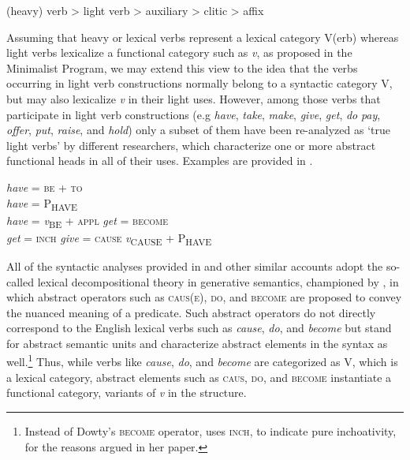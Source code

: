 \begin{exe}
\ex \label{ex:25} 	(heavy) verb > light verb > auxiliary > clitic > affix
\end{exe}

Assuming that heavy or lexical verbs represent a lexical category V(erb) where\-as light verbs lexicalize a functional category such as \textit{v}, as proposed in the Minimalist Program, we may extend this view to the idea that the verbs occurring in light verb constructions normally belong to a syntactic category V, but may also lexicalize \textit{v} in their light uses. However, among those verbs that participate in light verb constructions (e.g \textit{have}, \textit{take}, \textit{make}, \textit{give}, \textit{get}, \textit{do} \textit{pay}, \textit{offer}, \textit{put}, \textit{raise}, and \textit{hold}) only a subset of them have been re-analyzed as ‘true light verbs’ by different researchers, which characterize one or more abstract functional heads in all of their uses. Examples are provided in .

\begin{exe}\ex\label{ex:26}
\begin{xlist}
    \ex \textit{have} = \textsc{be} + \textsc{to} \hfill \citep{Benveniste1966,DenDikken1995,Kayne1993} \\
    \textit{have} = P\textsubscript{HAVE}			\hfill \citep{Harley1997} \\
    \textit{have} = \textit{v}\textsubscript{BE} + \textsc{appl} \hfill \citep{Kim2012}
    \ex \textit{get} = \textsc{become} \hfill \citep{McIntyre2005a,McIntyre2005b} \\
    \textit{get} = \textsc{inch} \hfill \citep{Shim2006}
    \ex \textit{give} = \textsc{cause} \textit{v}\textsubscript{CAUSE} + P\textsubscript{HAVE} \hfill \citep{Harley2003}
\end{xlist}
\end{exe}

All of the syntactic analyses provided in   and other similar accounts adopt the so-called lexical decompositional theory in generative semantics, championed by \citet{Dowty1979}, in which abstract operators such as \textsc{caus(e)}, \textsc{do}, and \textsc{become} are proposed to convey the nuanced meaning of a predicate. Such abstract operators do not directly correspond to the English lexical verbs such as \textit{cause}, \textit{do}, and \textit{become} but stand for abstract semantic units and characterize abstract elements in the syntax as well.\footnote{Instead of Dowty's \textrm{\textsc{become}} \textrm{operator, \citet{Shim2006} uses} \textrm{\textsc{inch}}\textrm{, to indicate pure inchoativity, for the reasons argued in her paper.}} Thus, while verbs like \textit{cause}, \textit{do}, and \textit{become} are categorized as V, which is a lexical category, abstract elements such as \textsc{caus}, \textsc{do}, and \textsc{become} instantiate a functional category, variants of \textit{v} in the structure. 

